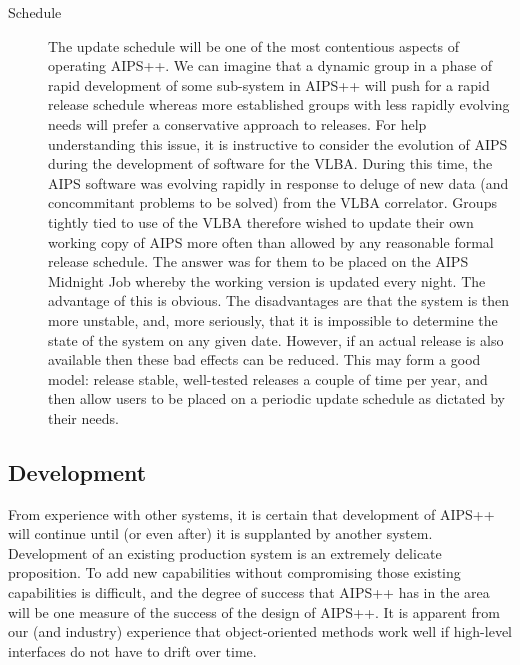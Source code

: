 \begin{description}
\item[Schedule] The update schedule will be one of the most contentious
aspects of operating AIPS++. We can imagine that a dynamic group in a
phase of rapid development of some sub-system in AIPS++ will push for
a rapid release schedule whereas more established groups with less
rapidly evolving needs will prefer a conservative approach to
releases. For help understanding this issue, it is instructive to
consider the evolution of AIPS during the development of software for
the VLBA. During this time, the AIPS software was evolving rapidly in
response to deluge of new data (and concommitant problems to be
solved) from the VLBA correlator. Groups tightly tied to use of the
VLBA therefore wished to update their own working copy of AIPS more
often than allowed by any reasonable formal release schedule. The
answer was for them to be placed on the AIPS Midnight Job whereby the
working version is updated every night. The advantage of this is
obvious. The disadvantages are that the system is then more unstable,
and, more seriously, that it is impossible to determine the state of
the system on any given date.  However, if an actual release is also
available then these bad effects can be reduced. This may form a good
model: release stable, well-tested releases a couple of time per year,
and then allow users to be placed on a periodic update schedule as
dictated by their needs.

\end{description}

\subsection{Development}

From experience with other systems, it is certain that development of
AIPS++ will continue until (or even after) it is supplanted by another
system. Development of an existing production system is an extremely
delicate proposition. To add new capabilities without compromising
those existing capabilities is difficult, and the degree of success
that AIPS++ has in the area will be one measure of the success of the
design of AIPS++. It is apparent from our (and industry) experience
that object-oriented methods work well if high-level interfaces do
not have to drift over time. 

